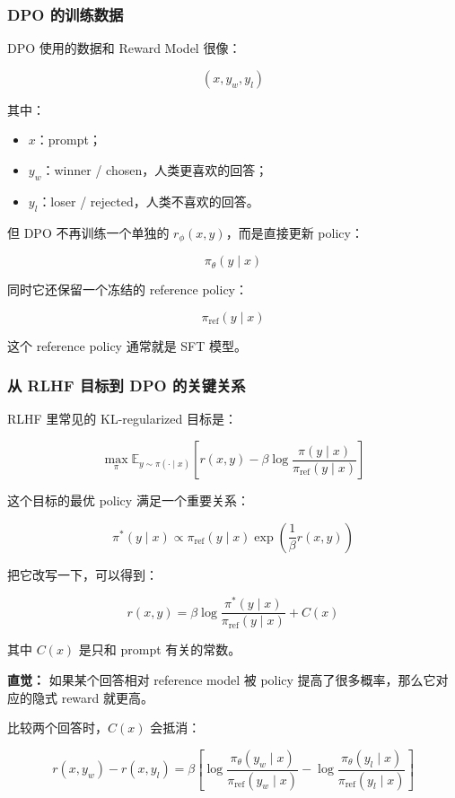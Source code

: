 \subsubsection{DPO 的训练数据}

DPO 使用的数据和 Reward Model 很像：

\[
(x, y_w, y_l)
\]

其中：

\begin{itemize}[leftmargin=1.5em]
  \item $x$：prompt；
  \item $y_w$：winner / chosen，人类更喜欢的回答；
  \item $y_l$：loser / rejected，人类不喜欢的回答。
\end{itemize}

但 DPO 不再训练一个单独的 $r_\phi(x,y)$，而是直接更新 policy：

\[
\pi_\theta(y \mid x)
\]

同时它还保留一个冻结的 reference policy：

\[
\pi_\text{ref}(y \mid x)
\]

这个 reference policy 通常就是 SFT 模型。

\subsubsection{从 RLHF 目标到 DPO 的关键关系}

RLHF 里常见的 KL-regularized 目标是：

\[
\max_\pi
\mathbb{E}_{y \sim \pi(\cdot \mid x)}
\left[
r(x,y)
-
\beta
\log
\frac{\pi(y \mid x)}{\pi_\text{ref}(y \mid x)}
\right]
\]

这个目标的最优 policy 满足一个重要关系：

\[
\pi^\ast(y \mid x)
\propto
\pi_\text{ref}(y \mid x)
\exp\left(\frac{1}{\beta}r(x,y)\right)
\]

把它改写一下，可以得到：

\[
r(x,y)
=
\beta
\log
\frac{\pi^\ast(y \mid x)}{\pi_\text{ref}(y \mid x)}
+ C(x)
\]

其中 $C(x)$ 是只和 prompt 有关的常数。

\begin{intubox}
\textbf{直觉：} 如果某个回答相对 reference model 被 policy 提高了很多概率，那么它对应的隐式 reward 就更高。
\end{intubox}

比较两个回答时，$C(x)$ 会抵消：

\[
r(x,y_w) - r(x,y_l)
=
\beta
\left[
\log
\frac{\pi_\theta(y_w \mid x)}{\pi_\text{ref}(y_w \mid x)}
-
\log
\frac{\pi_\theta(y_l \mid x)}{\pi_\text{ref}(y_l \mid x)}
\right]
\]

